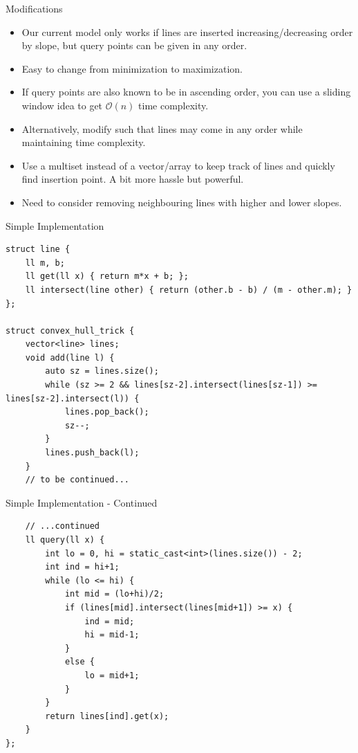 \documentclass{beamer}
\begin{document}
\begin{frame}[plain]{Modifications}
    \begin{itemize}
        \item<1-> Our current model only works if lines are inserted increasing/decreasing order by slope, but query points can be given in any order.
        \item<2-> Easy to change from minimization to maximization.
        \item<3-> If query points are also known to be in ascending order, you can use a sliding window idea to get $\mathcal{O}(n)$ time complexity.
        \item<4-> Alternatively, modify such that lines may come in any order while maintaining time complexity.
        \item<5-> Use a multiset instead of a vector/array to keep track of lines and quickly find insertion point. A bit more hassle but powerful.
        \item<6-> Need to consider removing neighbouring lines with higher and lower slopes.
    \end{itemize}
\end{frame}

\begin{frame}{Simple Implementation}
    \begin{scriptsize}
        \begin{verbatim}
struct line {
    ll m, b;
    ll get(ll x) { return m*x + b; };
    ll intersect(line other) { return (other.b - b) / (m - other.m); }
};

struct convex_hull_trick {
    vector<line> lines;
    void add(line l) {
        auto sz = lines.size();
        while (sz >= 2 && lines[sz-2].intersect(lines[sz-1]) >= lines[sz-2].intersect(l)) {
            lines.pop_back();
            sz--;
        }
        lines.push_back(l);
    }
    // to be continued...
        \end{verbatim}
    \end{scriptsize}
\end{frame}

\begin{frame}{Simple Implementation - Continued}
    \begin{scriptsize}
        \begin{verbatim}
    // ...continued
    ll query(ll x) {
        int lo = 0, hi = static_cast<int>(lines.size()) - 2;
        int ind = hi+1;
        while (lo <= hi) {
            int mid = (lo+hi)/2;
            if (lines[mid].intersect(lines[mid+1]) >= x) {
                ind = mid;
                hi = mid-1;
            }
            else {
                lo = mid+1;
            }
        }
        return lines[ind].get(x);
    }
};
        \end{verbatim}
    \end{scriptsize}
\end{frame}
\end{document}
